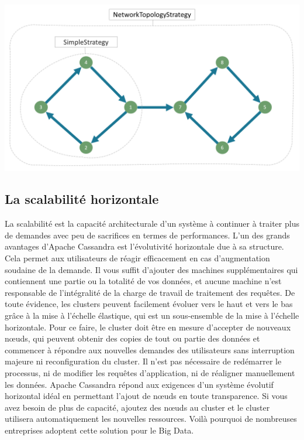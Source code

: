 \documentclass[12pt, letterpaper]{report}
\begin{document}
\centering\includegraphics[width=\textwidth]{replicationStrategy}
\subsection{La scalabilité horizontale}
\justifying
La scalabilité est la capacité architecturale d'un système à continuer à traiter plus de demandes avec peu de sacrifices en termes de performances.
\newline
L'un des grands avantages d'Apache Cassandra est l'évolutivité horizontale due à sa structure. Cela permet aux utilisateurs de réagir efficacement en cas d’augmentation soudaine de la demande. Il vous suffit d'ajouter des machines supplémentaires qui contiennent une partie ou la totalité de vos données, et aucune machine n'est responsable de l'intégralité de la charge de travail de traitement des requêtes. De toute évidence, les clusters peuvent facilement évoluer vers le haut et vers le bas grâce à la mise à l'échelle élastique, qui est un sous-ensemble de la mise à l'échelle horizontale.
\newline
Pour ce faire, le cluster doit être en mesure d'accepter de nouveaux nœuds, qui peuvent obtenir des copies de tout ou partie des données et commencer à répondre aux nouvelles demandes des utilisateurs sans interruption majeure ni reconfiguration du cluster. Il n'est pas nécessaire de redémarrer le processus, ni de modifier les requêtes d'application, ni de réaligner manuellement les données.
\newline
Apache Cassandra répond aux exigences d'un système évolutif horizontal idéal en permettant l'ajout de nœuds en toute transparence. Si vous avez besoin de plus de capacité, ajoutez des nœuds au cluster et le cluster utilisera automatiquement les nouvelles ressources. Voilà pourquoi de nombreuses entreprises adoptent cette solution pour le Big Data.
\end{document}
